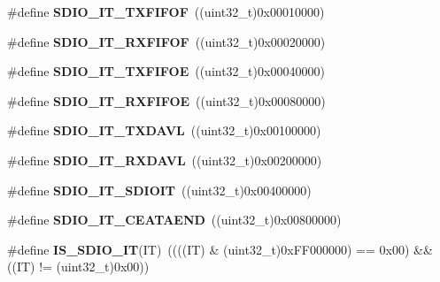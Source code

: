 \begin{DoxyCompactItemize}
\item 
\hypertarget{group__SDIO__Interrupt__sources_ga3ec471bd9233561d6e929ebac6362b75}{
\#define {\bfseries SDIO\_\-IT\_\-TXFIFOF}~((uint32\_\-t)0x00010000)}
\label{group__SDIO__Interrupt__sources_ga3ec471bd9233561d6e929ebac6362b75}

\item 
\hypertarget{group__SDIO__Interrupt__sources_gae60a1d8e5a7caff85d84e513b093b8a8}{
\#define {\bfseries SDIO\_\-IT\_\-RXFIFOF}~((uint32\_\-t)0x00020000)}
\label{group__SDIO__Interrupt__sources_gae60a1d8e5a7caff85d84e513b093b8a8}

\item 
\hypertarget{group__SDIO__Interrupt__sources_gabff1466c2f2effbe30b80a11c132d7c0}{
\#define {\bfseries SDIO\_\-IT\_\-TXFIFOE}~((uint32\_\-t)0x00040000)}
\label{group__SDIO__Interrupt__sources_gabff1466c2f2effbe30b80a11c132d7c0}

\item 
\hypertarget{group__SDIO__Interrupt__sources_ga80b01aaf64c873d21bfa95e5d98d8766}{
\#define {\bfseries SDIO\_\-IT\_\-RXFIFOE}~((uint32\_\-t)0x00080000)}
\label{group__SDIO__Interrupt__sources_ga80b01aaf64c873d21bfa95e5d98d8766}

\item 
\hypertarget{group__SDIO__Interrupt__sources_gac8e5744e6d977182a6fc7484a6f1195e}{
\#define {\bfseries SDIO\_\-IT\_\-TXDAVL}~((uint32\_\-t)0x00100000)}
\label{group__SDIO__Interrupt__sources_gac8e5744e6d977182a6fc7484a6f1195e}

\item 
\hypertarget{group__SDIO__Interrupt__sources_gaf236079642db95772334d1e9b9b27570}{
\#define {\bfseries SDIO\_\-IT\_\-RXDAVL}~((uint32\_\-t)0x00200000)}
\label{group__SDIO__Interrupt__sources_gaf236079642db95772334d1e9b9b27570}

\item 
\hypertarget{group__SDIO__Interrupt__sources_gaf5d7559460a9ff1fccc82d815de25cb4}{
\#define {\bfseries SDIO\_\-IT\_\-SDIOIT}~((uint32\_\-t)0x00400000)}
\label{group__SDIO__Interrupt__sources_gaf5d7559460a9ff1fccc82d815de25cb4}

\item 
\hypertarget{group__SDIO__Interrupt__sources_gae045cd5ba681d2df8b1031b8f659139a}{
\#define {\bfseries SDIO\_\-IT\_\-CEATAEND}~((uint32\_\-t)0x00800000)}
\label{group__SDIO__Interrupt__sources_gae045cd5ba681d2df8b1031b8f659139a}

\item 
\hypertarget{group__SDIO__Interrupt__sources_ga0e413e92ec50bab73042e8965acc3e6c}{
\#define {\bfseries IS\_\-SDIO\_\-IT}(IT)~((((IT) \& (uint32\_\-t)0xFF000000) == 0x00) \&\& ((IT) != (uint32\_\-t)0x00))}
\label{group__SDIO__Interrupt__sources_ga0e413e92ec50bab73042e8965acc3e6c}

\end{DoxyCompactItemize}
